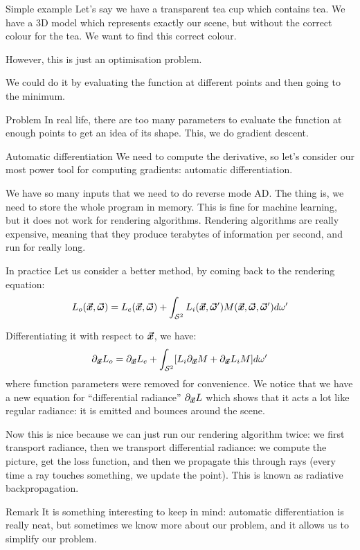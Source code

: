 \documentclass[a4paper]{article}
\begin{document}
\begin{parag}{Simple example}
    Let's say we have a transparent tea cup which contains tea. We have a 3D model which represents exactly our scene, but without the correct colour for the tea. We want to find this correct colour.

    However, this is just an optimisation problem.

    We could do it by evaluating the function at different points and then going to the minimum.

    \begin{subparag}{Problem}
        In real life, there are too many parameters to evaluate the function at enough points to get an idea of its shape. This, we do gradient descent.
    \end{subparag}
\end{parag}

\begin{parag}{Automatic differentiation}
    We need to compute the derivative, so let's consider our most power tool for computing gradients: automatic differentiation.

    We have so many inputs that we need to do reverse mode AD. The thing is, we need to store the whole program in memory. This is fine for machine learning, but it does not work for rendering algorithms. Rendering algorithms are really expensive, meaning that they produce terabytes of information per second, and run for really long.
\end{parag}

\begin{parag}{In practice}
    Let us consider a better method, by coming back to the rendering equation: 
    \[L_o\left(\bvec{x}, \bvec{\omega}\right) = L_e\left(\bvec{x}, \bvec{\omega}\right) + \int_{\mathcal{S}^2} L_i\left(\bvec{x}, \bvec{\omega}'\right) M\left(\bvec{x}, \bvec{\omega}, \bvec{\omega}'\right) d\omega'\]
    
    Differentiating it with respect to $\bm{\protect\vec{x}}$, we have: 
    \[\partial_{\bvec{x}} L_o = \partial_{\bvec{x}} L_e + \int_{\mathcal{S}^2} \left[L_i \partial_{\bvec{x}} M + \partial_{\bvec{x}} L_i M\right]d\omega'\]
    where function parameters were removed for convenience. We notice that we have a new equation for ``differential radiance'' $\partial_{\bm{\protect\vec{x}}} L$ which shows that it acts a lot like regular radiance: it is emitted and bounces around the scene.

    Now this is nice because we can just run our rendering algorithm twice: we first transport radiance, then we transport differential radiance: we compute the picture, get the loss function, and then we propagate this through rays (every time a ray touches something, we update the point). This is known as radiative backpropagation.

    \begin{subparag}{Remark}
        It is something interesting to keep in mind: automatic differentiation is really neat, but sometimes we know more about our problem, and it allows us to simplify our problem.
    \end{subparag}
\end{parag}
\end{document}
